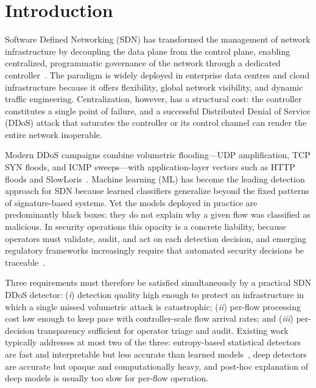 ﻿\documentclass[review,12pt]{elsarticle}
\begin{document}
\section{Introduction}
\label{sec:intro}

Software Defined Networking (SDN) has transformed the management of network infrastructure by decoupling the data plane from the control plane, enabling centralized, programmatic governance of the network through a dedicated controller~\cite{mckeown2008openflow,kreutz2015sdn}. The paradigm is widely deployed in enterprise data centres and cloud infrastructure because it offers flexibility, global network visibility, and dynamic traffic engineering. Centralization, however, has a structural cost: the controller constitutes a single point of failure, and a successful Distributed Denial of Service (DDoS) attack that saturates the controller or its control channel can render the entire network inoperable.

Modern DDoS campaigns combine volumetric flooding---UDP amplification, TCP SYN floods, and ICMP sweeps---with application-layer vectors such as HTTP floods and SlowLoris~\cite{mirkovic2004taxonomy,sharafaldin2019ddos,akarma2026agents}. Machine learning (ML) has become the leading detection approach for SDN because learned classifiers generalize beyond the fixed patterns of signature-based systems. Yet the models deployed in practice are predominantly black boxes: they do not explain why a given flow was classified as malicious. In security operations this opacity is a concrete liability, because operators must validate, audit, and act on each detection decision, and emerging regulatory frameworks increasingly require that automated security decisions be traceable~\cite{toqeer2026climate,jan2025blockchain,arrieta2020xai}.

Three requirements must therefore be satisfied simultaneously by a practical SDN DDoS detector: (\emph{i}) detection quality high enough to protect an infrastructure in which a single missed volumetric attack is catastrophic; (\emph{ii}) per-flow processing cost low enough to keep pace with controller-scale flow arrival rates; and (\emph{iii}) per-decision transparency sufficient for operator triage and audit. Existing work typically addresses at most two of the three: entropy-based statistical detectors are fast and interpretable but less accurate than learned models~\cite{mousavi2015early}, deep detectors are accurate but opaque and computationally heavy, and post-hoc explanation of deep models is usually too slow for per-flow operation.
\end{document}
